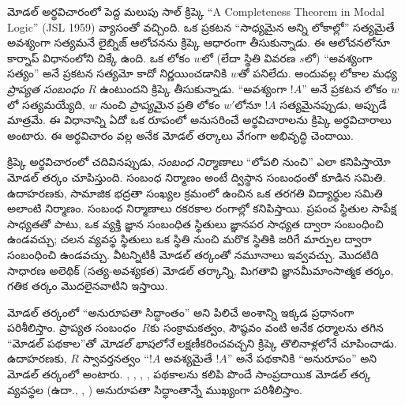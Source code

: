 \documentclass[../../../include/open-logic-section]{subfiles}
\begin{document}
మోడల్ అర్థవిచారంలో పెద్ద మలుపు
సాల్ క్రిప్కె “A Completeness Theorem in
Modal Logic” (JSL 1959) వ్యాసంతో వచ్చింది.
ఒక ప్రకటన “సాధ్యమైన అన్ని లోకాల్లో”
సత్యమైతే అవశ్యంగా సత్యమనే లైబ్నిజ్
ఆలోచనను క్రిప్కె ఆధారంగా తీసుకున్నాడు.
ఈ ఆలోచనలోనూ కార్నాప్ విధానంలోని చిక్కే ఉంది.
ఒక లోకం $w$లో (లేదా స్థితి వివరణ $s$లో) “అవశ్యంగా
సత్యం” అనే ప్రకటన సత్యమో కాదో నిర్ణయించడానికి
$w$తో పనిలేదు. అందువల్ల లోకాల మధ్య
\emph{ప్రాప్యత సంబంధం} $R$ ఉంటుందని క్రిప్కె తీసుకున్నాడు.
“అవశ్యంగా $!A$” అనే ప్రకటన లోకం $w$లో సత్యమయ్యేది,
$w$ నుంచి \emph{ప్రాప్యమైన} ప్రతి లోకం $w'$లోనూ $!A$
సత్యమైనప్పుడు, అప్పుడే మాత్రమే.
ఈ విధానాన్ని ఏదో ఒక రూపంలో అనుసరించే
అర్థవిచారాలను క్రిప్కె అర్థవిచారాలు అంటారు.
ఈ అర్థవిచారం వల్ల అనేక మోడల్ తర్కాలు వేగంగా అభివృద్ధి చెందాయి.

క్రిప్కె అర్థవిచారంలో చదివినప్పుడు,
\emph{సంబంధ నిర్మాణాలు} “లోపలి నుంచి”
ఎలా కనిపిస్తాయో మోడల్ తర్కం చూపిస్తుంది.
సంబంధ నిర్మాణం అంటే ద్విస్థాన
సంబంధంతో కూడిన సమితి.
ఉదాహరణకు, సామాజిక భద్రతా సంఖ్యల
క్రమంలో ఉంచిన ఒక తరగతి విద్యార్థుల
సమితి అలాంటి నిర్మాణం. సంబంధ నిర్మాణాలు
రకరకాల రంగాల్లో కనిపిస్తాయి.
ప్రపంచ స్థితుల సాపేక్ష సాధ్యతతో
పాటు, ఒక వ్యక్తి జ్ఞాన సంబంధిత
స్థితులు జ్ఞానపర సాధ్యత ద్వారా
సంబంధించి ఉండవచ్చు; చలన వ్యవస్థ
స్థితులు ఒక స్థితి నుంచి మరొక స్థితికి జరిగే మార్పుల ద్వారా
సంబంధించి ఉండవచ్చు. వీటన్నిటికీ
మోడల్ తర్కంతో నమూనాలు ఇవ్వవచ్చు.
మొదటిది సాధారణ అలెథిక్ (సత్య-అవశ్యకత)
మోడల్ తర్కాన్ని, మిగతావి జ్ఞానమీమాంసాత్మక
తర్కం, గతిక తర్కం మొదలైనవాటిని ఇస్తాయి.

మోడల్ తర్కంలో “అనురూపతా సిద్ధాంతం” అని పిలిచే
అంశాన్ని ఇక్కడ ప్రధానంగా పరిశీలిస్తాం.
ప్రాప్యత సంబంధం~$R$కు సంక్రామకత్వం,
సౌష్ఠవం వంటి అనేక ధర్మాలను తగిన “మోడల్ పథకాల”తో
\emph{మోడల్ భాషలోనే} లక్షణీకరించవచ్చని క్రిప్కె
తొలినాళ్లలోనే చూపించాడు. ఉదాహరణకు, $R$ స్వావర్తనత్వం
“$!A$ అవశ్యమైతే $!A$” అనే పథకానికి “అనురూపం”
అని మోడల్ తర్కంలో అంటారు.
, , , ,
 పథకాలను కలిపి పొందే
సాంప్రదాయిక మోడల్ తర్క వ్యవస్థల
(ఉదా., , )
అనురూపతా సిద్ధాంతాన్నే
ముఖ్యంగా పరిశీలిస్తాం.
\end{document}
